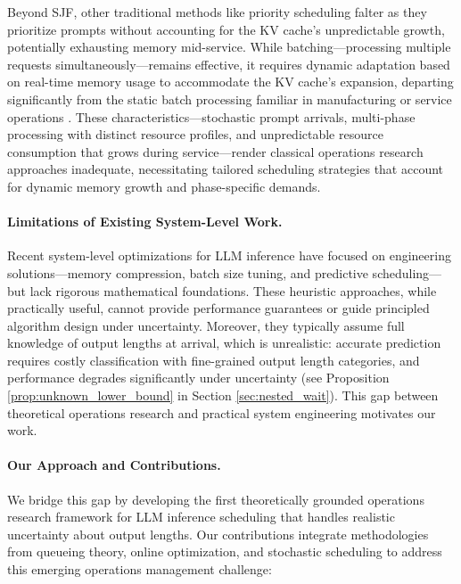Beyond SJF, other traditional methods like priority scheduling falter as they prioritize prompts without accounting for the KV cache's unpredictable growth, potentially exhausting memory mid-service. While batching---processing multiple requests simultaneously---remains effective, it requires dynamic adaptation based on real-time memory usage to accommodate the KV cache's expansion, departing significantly from the static batch processing familiar in manufacturing or service operations \citep{patel2024splitwise, zhong2024distserve}. These characteristics---stochastic prompt arrivals, multi-phase processing with distinct resource profiles, and unpredictable resource consumption that grows during service---render classical operations research approaches inadequate, necessitating tailored scheduling strategies that account for dynamic memory growth and phase-specific demands.

\paragraph{Limitations of Existing System-Level Work.}
Recent system-level optimizations for LLM inference \citep{yu2022orca, kwon2023efficient, agrawal2023sarathi, pope2023efficiently, deepseekai2024deepseekv2strongeconomicalefficient, patel2024splitwise, zhong2024distserve} have focused on engineering solutions---memory compression, batch size tuning, and predictive scheduling---but lack rigorous mathematical foundations. These heuristic approaches, while practically useful, cannot provide performance guarantees or guide principled algorithm design under uncertainty. Moreover, they typically assume full knowledge of output lengths at arrival, which is unrealistic: accurate prediction requires costly classification with fine-grained output length categories, and performance degrades significantly under uncertainty (see Proposition \ref{prop:unknown_lower_bound} in Section \ref{sec:nested_wait}). This gap between theoretical operations research and practical system engineering motivates our work.

\paragraph{Our Approach and Contributions.}
We bridge this gap by developing the first theoretically grounded operations research framework for LLM inference scheduling that handles realistic uncertainty about output lengths. Our contributions integrate methodologies from queueing theory, online optimization, and stochastic scheduling to address this emerging operations management challenge:

